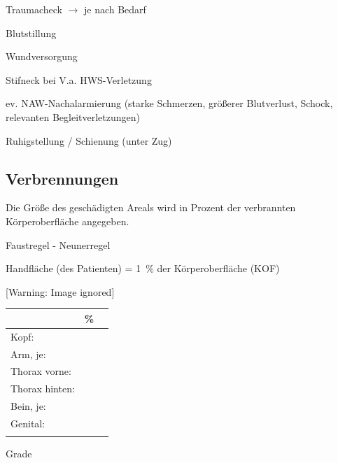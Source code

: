 \documentclass{article}
\begin{document}
{\mdseries
Traumacheck ${\rightarrow}$ je nach Bedarf}

{\mdseries
Blutstillung}

{\mdseries
Wundversorgung}

{\mdseries
Stifneck bei V.a. HWS-Verletzung}

{\mdseries
ev. NAW-Nachalarmierung (starke Schmerzen, gr\"o{\ss}erer Blutverlust,
Schock, relevanten Begleit\-verletzungen)}

{\mdseries
Ruhigstellung / Schienung (unter Zug)}

\subsection{Verbrennungen}
{\mdseries
Die Gr\"o{\ss}e des gesch\"adigten Areals wird in Prozent der
ver\-brannten K\"orperoberfl\"ache angegeben.}

{\mdseries\color{black}
Faustregel - Neunerregel}

{\mdseries
Handfl\"ache (des Patienten) = 1~\% der K\"orperoberfl\"ache (KOF)}

\begin{center}
 [Warning: Image ignored] %

\end{center}
\begin{flushright}
\tablehead{}\begin{supertabular}{|m{2.134cm}|m{2.134cm}|m{2.134cm}|}
\hline
 &
\centering \%\par

 &
\\\hline
{\mdseries Kopf:}

 &
\par

 &
\\\hline
{\mdseries Arm, je:}

 &
\par

 &
\\\hline
{\mdseries Thorax vorne:}

 &
\par

 &
\\\hline
{\mdseries Thorax hinten:}

 &
\par

 &
\\\hline
{\mdseries Bein, je:}

 &
\par

 &
\\\hline
{\mdseries Genital: }

 &
\par

 &
\\\hline
 &
 &
\\\hline
\end{supertabular}
\end{flushright}
{\mdseries\color{black}
Grade}
\end{document}
